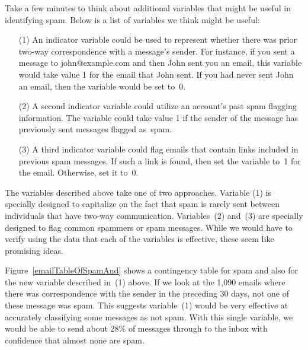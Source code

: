 Take a few minutes to think about additional variables that might be useful in identifying spam. Below is a list of variables we think might be useful:
\begin{enumerate}
\item[(1)] An indicator variable could be used to represent whether there was prior two-way correspondence with a message's sender. For instance, if you sent a message to john@example.com and then John sent you an email, this variable would take value 1 for the email that John sent. If you had never sent John an email, then the variable would be set to~0.
\item[(2)] A second indicator variable could utilize an account's past spam flagging information. The variable could take value 1 if the sender of the message has previously sent messages flagged as~spam.
\item[(3)] A third indicator variable could flag emails that contain links included in previous spam messages. If such a link is found, then set the variable to~1 for the email. Otherwise, set it to~0.
\end{enumerate}
The variables described above take one of two approaches. Variable (1) is specially designed to capitalize on the fact that spam is rarely sent between individuals that have two-way communication. Variables~(2) and~(3) are specially designed to flag common spammers or spam messages. While we would have to verify using the data that each of the variables is effective, these seem like promising ideas.

Figure~\ref{emailTableOfSpamAnd} shows a contingency table for spam and also for the new variable described in~(1) above. If we look at the 1,090 emails where there was correspondence with the sender in the preceding 30 days, not one of these message was spam. This suggests variable~(1) would be very effective at accurately classifying some messages as not spam. With this single variable, we would be able to send about 28\% of messages through to the inbox with confidence that almost none are spam.

